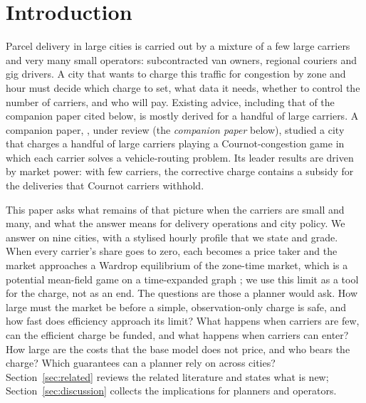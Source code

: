 \documentclass[preprint,11pt,authoryear]{elsarticle}
\theoremstyle{plain}
\theoremstyle{remark}
\begin{document}
\section{Introduction}\label{sec:intro}

Parcel delivery in large cities is carried out by a mixture of a few large carriers and very many small operators: subcontracted van owners, regional couriers and gig drivers. A city that wants to charge this traffic for congestion by zone and hour must decide which charge to set, what data it needs, whether to control the number of carriers, and who will pay. Existing advice, including that of the companion paper cited below, is mostly derived for a handful of large carriers. A companion paper, \citet{Omega2026}, under review (the \emph{companion paper} below), studied a city that charges a handful of large carriers playing a Cournot-congestion game in which each carrier solves a vehicle-routing problem. Its leader results are driven by market power: with few carriers, the corrective charge contains a subsidy for the deliveries that Cournot carriers withhold.

This paper asks what remains of that picture when the carriers are small and many, and what the answer means for delivery operations and city policy. We answer on nine cities, with a stylised hourly profile that we state and grade. When every carrier's share goes to zero, each becomes a price taker and the market approaches a Wardrop equilibrium of the zone-time market, which is a potential mean-field game on a time-expanded graph \citep{LasryLions2007,HuangMalhameCaines2006,GomesMohrSouza2010,Gueant2015,CalderoneSastry2017}; we use this limit as a tool for the charge, not as an end. The questions are those a planner would ask. How large must the market be before a simple, observation-only charge is safe, and how fast does efficiency approach its limit? What happens when carriers are few, can the efficient charge be funded, and what happens when carriers can enter? How large are the costs that the base model does not price, and who bears the charge? Which guarantees can a planner rely on across cities? Section~\ref{sec:related} reviews the related literature and states what is new; Section~\ref{sec:discussion} collects the implications for planners and operators.
\end{document}
